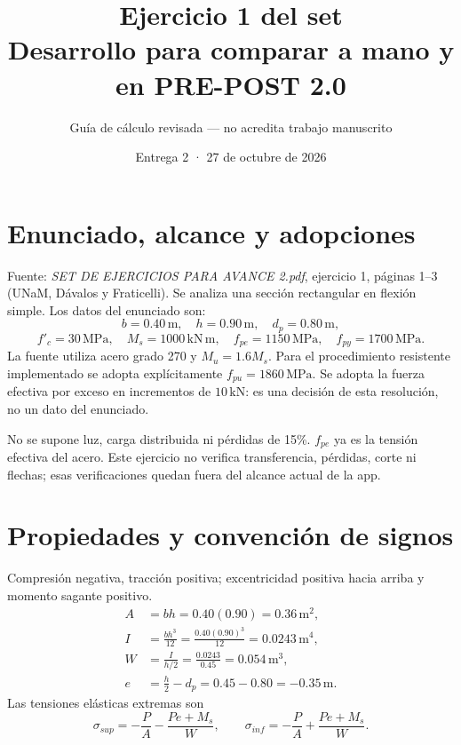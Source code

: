\documentclass[11pt,a4paper]{article}
\title{Ejercicio 1 del set\\Desarrollo para comparar a mano y en PRE-POST 2.0}
\author{Guía de cálculo revisada — no acredita trabajo manuscrito}
\date{Entrega 2 · 27 de octubre de 2026}
\begin{document}
\maketitle
\section{Enunciado, alcance y adopciones}
Fuente: \textit{SET DE EJERCICIOS PARA AVANCE 2.pdf}, ejercicio 1, páginas 1--3 (UNaM, Dávalos y Fraticelli). Se analiza una sección rectangular en flexión simple. Los datos del enunciado son:
\[
b=0.40\,\mathrm m,\quad h=0.90\,\mathrm m,\quad d_p=0.80\,\mathrm m,
\]
\[
f'_c=30\,\mathrm{MPa},\quad M_s=1000\,\mathrm{kN\,m},\quad f_{pe}=1150\,\mathrm{MPa},\quad f_{py}=1700\,\mathrm{MPa}.
\]
La fuente utiliza acero grado 270 y $M_u=1.6M_s$. Para el procedimiento resistente implementado se adopta explícitamente $f_{pu}=1860\,\mathrm{MPa}$. Se adopta la fuerza efectiva por exceso en incrementos de $10\,\mathrm{kN}$: es una decisión de esta resolución, no un dato del enunciado.

No se supone luz, carga distribuida ni pérdidas de 15\%. $f_{pe}$ ya es la tensión efectiva del acero. Este ejercicio no verifica transferencia, pérdidas, corte ni flechas; esas verificaciones quedan fuera del alcance actual de la app.

\section{Propiedades y convención de signos}
Compresión negativa, tracción positiva; excentricidad positiva hacia arriba y momento sagante positivo.
\begin{align*}
A&=bh=0.40(0.90)=0.36\,\mathrm{m^2},\\
I&=\frac{bh^3}{12}=\frac{0.40(0.90)^3}{12}=0.0243\,\mathrm{m^4},\\
W&=\frac{I}{h/2}=\frac{0.0243}{0.45}=0.054\,\mathrm{m^3},\\
e&=\frac h2-d_p=0.45-0.80=-0.35\,\mathrm m.
\end{align*}
Las tensiones elásticas extremas son
\[
\sigma_{sup}=-\frac PA-\frac{Pe+M_s}{W},\qquad
\sigma_{inf}=-\frac PA+\frac{Pe+M_s}{W}.
\]
\newpage
\end{document}
